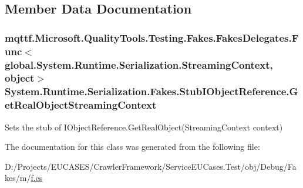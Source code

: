 \subsection{Member Data Documentation}
\hypertarget{class_system_1_1_runtime_1_1_serialization_1_1_fakes_1_1_stub_i_object_reference_ad7f88dcf4fede261883c50960d0f3dcd}{
\subsubsection[{Get\-Real\-Object\-Streaming\-Context}]{\setlength{\rightskip}{0pt plus 5cm}mqttf.\-Microsoft.\-Quality\-Tools.\-Testing.\-Fakes.\-Fakes\-Delegates.\-Func$<$global.\-System.\-Runtime.\-Serialization.\-Streaming\-Context, object$>$ System.\-Runtime.\-Serialization.\-Fakes.\-Stub\-I\-Object\-Reference.\-Get\-Real\-Object\-Streaming\-Context}}\label{class_system_1_1_runtime_1_1_serialization_1_1_fakes_1_1_stub_i_object_reference_ad7f88dcf4fede261883c50960d0f3dcd}


Sets the stub of I\-Object\-Reference.\-Get\-Real\-Object(\-Streaming\-Context context)



The documentation for this class was generated from the following file\-:\begin{DoxyCompactItemize}
\item 
D\-:/\-Projects/\-E\-U\-C\-A\-S\-E\-S/\-Crawler\-Framework/\-Service\-E\-U\-Cases.\-Test/obj/\-Debug/\-Fakes/m/\hyperlink{m_2f_8cs}{f.\-cs}\end{DoxyCompactItemize}
